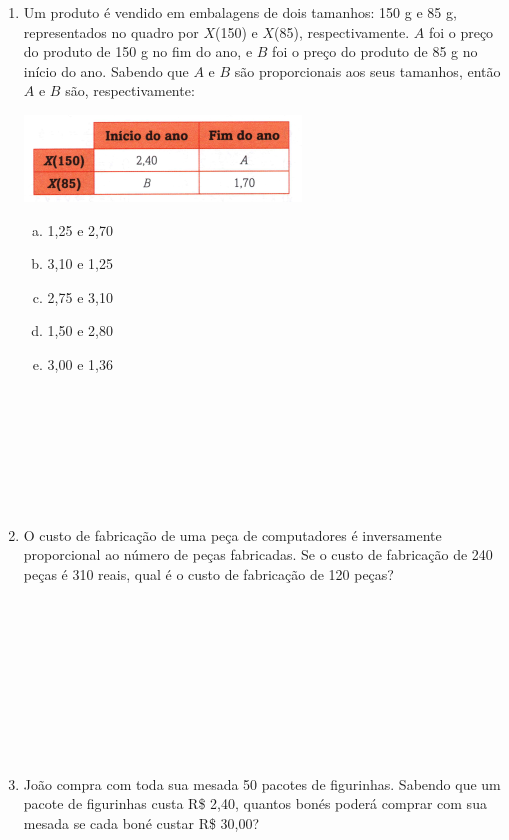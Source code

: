 \documentclass[a4paper,14pt]{article}
\begin{document}
\begin{multicols}{2}
\begin{enumerate}
            \item Um produto é vendido em embalagens de dois tamanhos: 150 g e 85 g, representados no quadro por $X$(150) e $X$(85), respectivamente. $A$ foi o preço do produto de 150 g no fim do ano, e $B$ foi o preço do produto de 85 g no início do ano. Sabendo que $A$ e $B$ são proporcionais aos seus tamanhos, então $A$ e $B$ são, respectivamente:
            \begin{center}
            	\includegraphics[width=1\linewidth]{8FMA10_imagens/adicionais-40}
            \end{center}
            \begin{enumerate}[a)]
            	\item 1,25 e 2,70
            	\item 3,10 e 1,25
            	\item 2,75 e 3,10
            	\item 1,50 e 2,80
            	\item 3,00 e 1,36 \\\\\\\\\\\\\\\\
            \end{enumerate}
        	\item O custo de fabricação de uma peça de computadores é inversamente proporcional ao número de peças fabricadas. Se o custo de fabricação de 240 peças é 310 reais, qual é o custo de fabricação de 120 peças? \\\\\\\\\\\\\\\\\\\\
        	\item João compra com toda sua mesada 50 pacotes de figurinhas. Sabendo que um pacote de figurinhas custa R\$ 2,40, quantos bonés poderá comprar com sua mesada se cada boné custar R\$ 30,00? \\\\\\\\\\\\\\\\\\\\
   	    \end{enumerate}
    \end{multicols}
\end{document}
